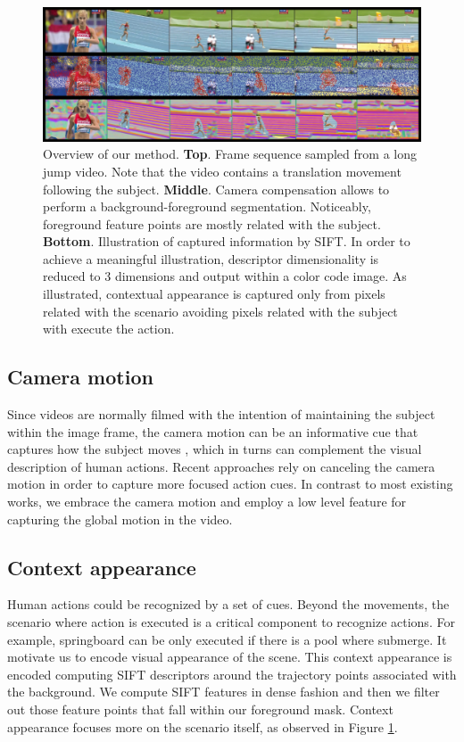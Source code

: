 \begin{figure}[t!]
\begin{center}
\includegraphics[width=0.98\linewidth]{fig/approach.png}
\end{center}
\caption{Overview of our method. \textbf{Top}. Frame sequence sampled from a long jump video. Note that the video contains a translation movement following the subject. \textbf{Middle}. Camera compensation allows to perform a background-foreground segmentation. Noticeably, foreground feature points are mostly related with the subject. \textbf{Bottom}. Illustration of captured information by SIFT. In order to achieve a meaningful illustration, descriptor dimensionality is reduced to 3 dimensions and output within a color code image. As illustrated, contextual appearance is captured only from pixels related with the scenario \ie avoiding pixels related with the subject with execute the action.}
\label{fig:approach}
\end{figure}

\subsection{Camera motion}
Since videos are normally filmed with the intention of maintaining the subject within the image frame, the camera motion can be an informative cue that captures how the subject moves , which in turns can complement the visual description of human actions. Recent approaches rely on canceling the camera motion in order to capture more focused action cues. In contrast to most existing works, we embrace the camera motion and employ a low level feature for capturing the global motion in the video.
\subsection{Context appearance}
Human actions could be recognized by a set of cues. Beyond the movements, the scenario where action is executed is a critical component to recognize actions. For example, springboard can be only executed if there is a pool where submerge. It motivate us to encode visual appearance of the scene. This context appearance is encoded computing SIFT \cite{lowe2004} descriptors around the trajectory points associated with the background. We compute SIFT features in dense fashion and then we filter out those feature points that fall within our foreground mask. Context appearance focuses more on the scenario itself, as observed in Figure \ref{fig:approach}. 
